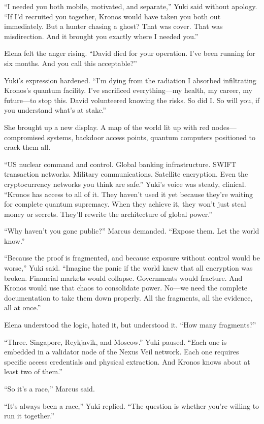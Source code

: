 ``I needed you both mobile, motivated, and separate,'' Yuki said without apology. ``If I'd recruited you together, Kronos would have taken you both out immediately. But a hunter chasing a ghost? That was cover. That was misdirection. And it brought you exactly where I needed you.''

Elena felt the anger rising. ``David died for your operation. I've been running for six months. And you call this acceptable?''

Yuki's expression hardened. ``I'm dying from the radiation I absorbed infiltrating Kronos's quantum facility. I've sacrificed everything---my health, my career, my future---to stop this. David volunteered knowing the risks. So did I. So will you, if you understand what's at stake.''

She brought up a new display. A map of the world lit up with red nodes---compromised systems, backdoor access points, quantum computers positioned to crack them all.

``US nuclear command and control. Global banking infrastructure. SWIFT transaction networks. Military communications. Satellite encryption. Even the cryptocurrency networks you think are safe.'' Yuki's voice was steady, clinical. ``Kronos has access to all of it. They haven't used it yet because they're waiting for complete quantum supremacy. When they achieve it, they won't just steal money or secrets. They'll rewrite the architecture of global power.''

``Why haven't you gone public?'' Marcus demanded. ``Expose them. Let the world know.''

``Because the proof is fragmented, and because exposure without control would be worse,'' Yuki said. ``Imagine the panic if the world knew that all encryption was broken. Financial markets would collapse. Governments would fracture. And Kronos would use that chaos to consolidate power. No---we need the complete documentation to take them down properly. All the fragments, all the evidence, all at once.''

Elena understood the logic, hated it, but understood it. ``How many fragments?''

``Three. Singapore, Reykjavik, and Moscow.'' Yuki paused. ``Each one is embedded in a validator node of the Nexus Veil network. Each one requires specific access credentials and physical extraction. And Kronos knows about at least two of them.''

``So it's a race,'' Marcus said.

``It's always been a race,'' Yuki replied. ``The question is whether you're willing to run it together.''

